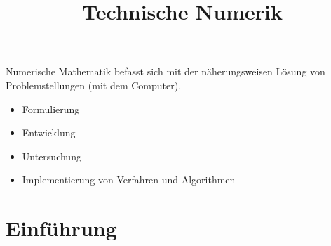 \documentclass[a4paper]{article}
\begin{document}
\title{Technische Numerik}
Numerische Mathematik befasst sich mit der näherungsweisen Lösung von Problemstellungen (mit dem Computer).
\begin{itemize}
  \item Formulierung
  \item Entwicklung
  \item Untersuchung
  \item Implementierung
    von Verfahren und Algorithmen
\end{itemize}
\section{Einführung}
\end{document}
